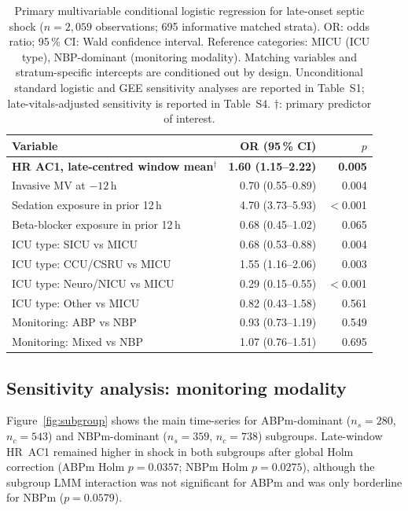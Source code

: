 \documentclass[referee,lineno,pdflatex]{sn-article-template/sn-jnl}
\begin{document}
\begin{table}[ht]
\centering
\caption{%
  Primary multivariable conditional logistic regression for late-onset septic shock
  ($n = 2{,}059$ observations; 695 informative matched strata).
  OR: odds ratio; 95\,\% CI: Wald confidence interval.
  Reference categories: MICU (ICU type), NBP-dominant (monitoring modality).
  Matching variables and stratum-specific intercepts are conditioned out by design.
  Unconditional standard logistic and GEE sensitivity analyses are reported in Table~S1;
  late-vitals-adjusted sensitivity is reported in Table~S4.
  $\dagger$: primary predictor of interest.%
}
\label{tab:model}
\begin{tabular}{lrr}
\toprule
Variable & OR (95\,\% CI) & $p$ \\
\midrule
\textbf{HR AC1, late-centred window mean}$^\dagger$ & \textbf{1.60 (1.15--2.22)} & \textbf{0.005} \\
Invasive MV at $-12$\,h  & 0.70 (0.55--0.89) & 0.004 \\
Sedation exposure in prior 12\,h & 4.70 (3.73--5.93) & $<$0.001 \\
Beta-blocker exposure in prior 12\,h & 0.68 (0.45--1.02) & 0.065 \\
ICU type: SICU vs MICU & 0.68 (0.53--0.88) & 0.004 \\
ICU type: CCU/CSRU vs MICU & 1.55 (1.16--2.06) & 0.003 \\
ICU type: Neuro/NICU vs MICU & 0.29 (0.15--0.55) & $<$0.001 \\
ICU type: Other vs MICU & 0.82 (0.43--1.58) & 0.561 \\
Monitoring: ABP vs NBP & 0.93 (0.73--1.19) & 0.549 \\
Monitoring: Mixed vs NBP & 1.07 (0.76--1.51) & 0.695 \\
\bottomrule
\end{tabular}
\end{table}

\subsection{Sensitivity analysis: monitoring modality}
\label{sec:res-sensitivity}

Figure~\ref{fig:subgroup} shows the main time-series for
ABPm-dominant ($n_s = 280$, $n_c = 543$) and NBPm-dominant
($n_s = 359$, $n_c = 738$) subgroups.
Late-window HR~AC1 remained higher in shock in both subgroups after global Holm correction
(ABPm Holm $p=0.0357$; NBPm Holm $p=0.0275$), although the subgroup LMM interaction
was not significant for ABPm and was only borderline for NBPm ($p=0.0579$).
\end{document}
